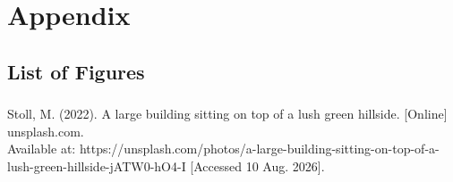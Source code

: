 \section{Appendix}

\subsection{List of Figures}

\subsubsection*{}

Stoll, M. (2022). A large building sitting on top of a lush green hillside. [Online] unsplash.com. \\ Available at: https://unsplash.com/photos/a-large-building-sitting-on-top-of-a-lush-green-hillside-jATW0-hO4-I [Accessed 10 Aug. 2026].